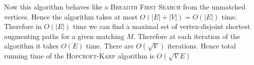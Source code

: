 \documentclass[a4paper, 11pt]{article}
\begin{document}
{\begin{enumerate}[label=\bfseries\alph*.]
Now this algorithm behaves like a \textsc{Breadth First Search} from the unmatched vertices. Hence the algorithm takes at most $O(|E|+|V|)=O(|E|)$ time. Therefore in $O(|E|)$ time we can find a maximal set of vertex-disjoint shortest augmenting paths for a given matching $M$. Therefore at each iteration of the algorithm it takes $O(E)$ time. There are $O(\sqrt{V})$ iterations. Hence total running time of the \textsc{Hopcroft-Karp} algorithm is $O(\sqrt{V}E)$
\end{enumerate}
}


\end{document}
